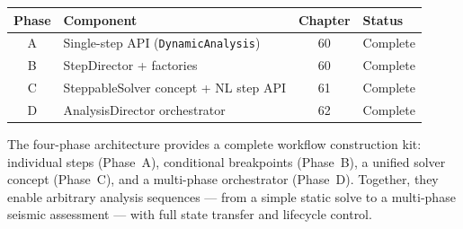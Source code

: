 \begin{center}
\begin{tabular}{clcl}
\hline
\textbf{Phase} & \textbf{Component} & \textbf{Chapter} & \textbf{Status} \\
\hline
A & Single-step API (\texttt{DynamicAnalysis})   & 60 & Complete \\
B & StepDirector + factories                     & 60 & Complete \\
C & SteppableSolver concept + NL step API        & 61 & Complete \\
D & AnalysisDirector orchestrator                & 62 & Complete \\
\hline
\end{tabular}
\end{center}

The four-phase architecture provides a complete workflow construction
kit: individual steps (Phase~A), conditional breakpoints (Phase~B), a
unified solver concept (Phase~C), and a multi-phase orchestrator
(Phase~D).  Together, they enable arbitrary analysis sequences — from a
simple static solve to a multi-phase seismic assessment — with full
state transfer and lifecycle control.
